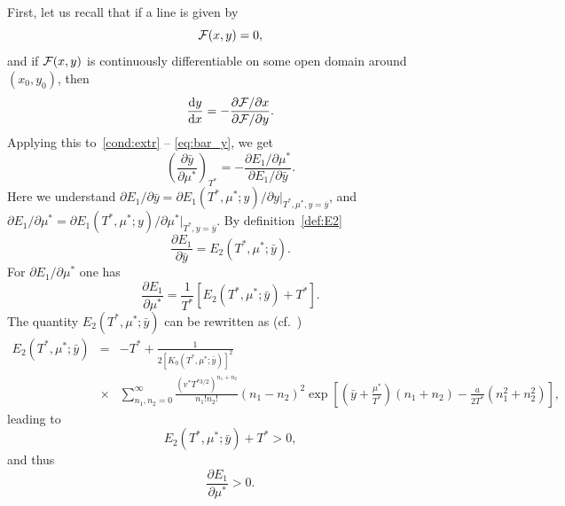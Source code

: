 \documentclass[12pt]{article}
\numberwithin{equation}{section}
\begin{document}
	First, let us recall that if a line is given by 
	\begin{equation*}
		{\cal F}(x,y) = 0,
	\end{equation*}
	and if ${\cal F}(x,y)$ is continuously differentiable on some open domain around $(x_0,y_0)$, then
	\begin{equation}
		\frac{{\rm d} y}{{\rm d} x} = - \frac{\partial {\cal F} / \partial x}{\partial {\cal F} / \partial y}.
	\end{equation}
	Applying this to~\eqref{cond:extr} -- \eqref{eq:bar_y}, we get
	\begin{equation}
		\left(\frac{\partial \bar{y}}{\partial \mu^*}  \right)_{T^*} = - \frac{\partial E_1 / \partial \mu^*}{\partial E_1 / \partial \bar{y}}.
	\end{equation}
	Here we understand $\partial E_1 / \partial \bar{y} = \partial E_1(T^*,\mu^*;y) / \partial y |_{T^*,\mu^*,y=\bar{y}}$, and $\partial E_1 / \partial\mu^* = \partial E_1(T^*,\mu^*;y) / \partial \mu^* |_{T^*,y=\bar{y}}$.
	By definition~\eqref{def:E2}
	\begin{equation}
		\frac{\partial E_1}{\partial \bar{y}} = E_2(T^*,\mu^*;\bar{y}).
	\end{equation}
	For $\partial E_1 / \partial \mu^*$ one has
	\begin{equation}
		\label{dE1dmu1}
		\frac{\partial E_1}{\partial \mu^*} = \frac{1}{T^*} [E_2(T^*,\mu^*;\bar{y}) + T^*].
	\end{equation}
	The quantity $E_2(T^*,\mu^*;\bar{y})$ can be rewritten as (cf.~\cite[(2.23)]{KKD20})
	\begin{eqnarray}
		\label{E2a}
		E_2(T^*,\mu^*;\bar{y}) & = & -T^* + \frac{1}{2 [K_0(T^*,\mu^*;\bar{y})]^2}
		\\
		& \times & \sum_{n_1, n_2 = 0}^{\infty} \frac{(v^* T^{*3/2})^{n_1+n_2}}{n_1!n_2!}(n_1 - n_2)^2 \exp[\left(\bar{y} + \frac{\mu^*}{T^*}\right)(n_1 + n_2) - \frac{a}{2T^*}(n_1^2 + n_2^2)],\nonumber
	\end{eqnarray}
	leading to
	\begin{equation}
		\label{E2pT}
		E_2(T^*,\mu^*;\bar{y}) + T^* > 0,
	\end{equation}
	and thus
	\begin{equation}
		\label{dE1dmu2}
		\frac{\partial E_1}{\partial \mu^*} > 0.
	\end{equation}
\end{document}
